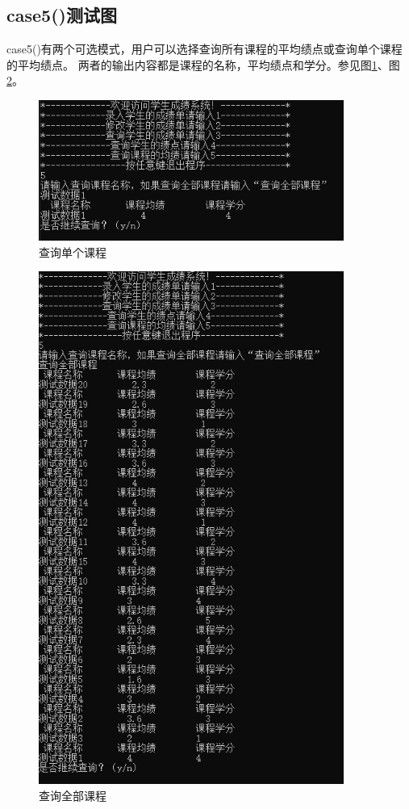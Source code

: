 \documentclass[fontset=windows]{article}
\begin{document}
\subsection{case5()测试图}
case5()有两个可选模式，用户可以选择查询所有课程的平均绩点或查询单个课程的平均绩点。
两者的输出内容都是课程的名称，平均绩点和学分。参见图\ref{ref18}、图\ref{ref19}。

\begin{figure}[h!]
	\begin{center}
		\includegraphics[width = 10cm]{查询单个课程.png}
		\caption{查询单个课程}
		\label{ref18}
	\end{center}
\end{figure}
\newpage
\begin{figure}[h!]
	\begin{center}
		\includegraphics[width = 10cm]{查询全部课程.png}
		\caption{查询全部课程}
		\label{ref19}
	\end{center}
\end{figure}
\end{document}
